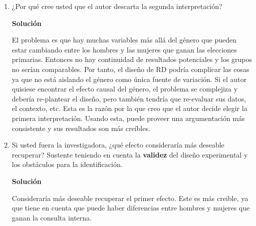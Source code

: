 \documentclass[a4paper, answers, addpoints, 11pt]{exam}
\newenvironment{solucion}{%
  \begin{mdframed}[
    backgroundcolor=blue!5,    %
    linecolor=blue!50,          %
    linewidth=2pt,              %
    leftmargin=10pt,            %
    rightmargin=8pt,           %
    topline=true,              %
    bottomline=true,            %
    roundcorner=10pt,           %
    innerleftmargin=10pt,       %
    innerrightmargin=10pt,      %
    innerbottommargin=10pt,     %
    innertopmargin=10pt         %
  ]%
  \begin{tcolorbox}[colframe=blue!50!black, colback=blue!50, coltitle=white, sharp corners=all, boxrule=1mm, width=\textwidth, halign=left, valign=center, top=0mm, bottom=0mm, left=0mm, right=0mm] \textbf{Solución} \end{tcolorbox} }{\end{mdframed}}
\begin{document}
\begin{enumerate}[resume]
\begin{enumerate}
\begin{solucion}
\begin{itemize}
    
    \item \textbf{Efecto causal del género:} este consideraría el efecto de ser hombre o mujer en la probabilidad de ganar las elecciones generales. Para  estimar el efecto localmente con el RD, entonces ahora el tratamiento se define como ser o no mujer dado que se ganó la elección cerrada. Entonces tocaría decir que la muestra de hombres y mujeres que ganan marginalmente la consulta interna es, en promedio, similar en características subyacentes. En otras palabras, que sus característica observables y no observables van a ser estadísticamente iguales. Pero esto es una afirmación muy fuerte, pues hay características que varían fácilmente por género, por ejemplo el estilo de comunicación, forma de hacer política, la edad también podría ser sistemáticamente diferente, etc. Así, el género podría no ser el único atributo que varía entre los hombres y las mujeres que ganan por un margen estrecho la consulta interna, apareciendo así un problema de comparabilidad.  Por ejemplo, 
   Por tanto, el diseño del RD planteado no sería la mejor estrategia para identificar el efecto causal del género sobre la probabilidad de ganar las elecciones generales, en este contexto.
\end{itemize}
\end{solucion}
        \item ¿Por qué cree usted que el autor descarta la segunda interpretación?
\begin{solucion}
El problema es que hay muchas variables más allá del género que pueden estar cambiando entre los hombres y las mujeres que ganan las elecciones primarias. Entonces no hay continuidad de resultados potenciales y los grupos no serían comparables. Por tanto, el diseño de RD podría complicar las cosas ya que no está aislando el género como única fuente de variación. Si el autor quisiese encontrar el efecto causal del género, el problema se complejiza y debería re-plantear el diseño, pero también tendría que re-evaluar sus datos, el contexto, etc. Esta es la razón por la que creo que el autor decide elegir la primera interpretación. Usando esta, puede proveer una argumentación más consistente y sus resultados son más creíbles.
\end{solucion}
        \item Si usted fuera la investigadora, ¿qué efecto consideraría más deseable recuperar? Sustente teniendo en cuenta la \textbf{validez} del diseño experimental y los obstáculos para la identificación.
\begin{solucion}
Consideraría más deseable recuperar el primer efecto. Este es más creible, ya que tiene en cuenta que puede haber diferencias entre hombres y mujeres que ganan la consulta interna.\\


\end{solucion}
\end{enumerate}
\end{enumerate}
\end{document}
